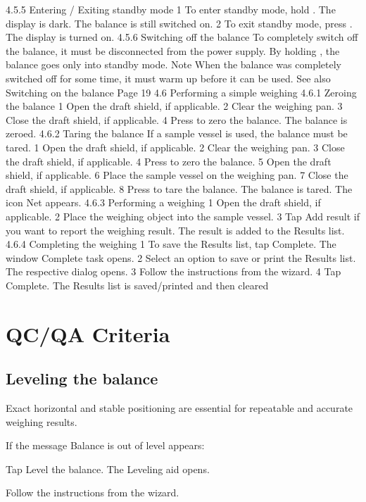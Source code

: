 \documentclass[12pt]{../SOP4_alpha}\usepackage[]{graphicx}\usepackage[]{xcolor}
\begin{document}
4.5.5 Entering / Exiting standby mode
1 To enter standby mode, hold .
The display is dark. The balance is still switched on.
2 To exit standby mode, press .
The display is turned on.
4.5.6 Switching off the balance
To completely switch off the balance, it must be disconnected from the power supply. By holding , the
balance goes only into standby mode.
Note
When the balance was completely switched off for some time, it must warm up before it can be used.
See also
Switching on the balance   Page 19
4.6 Performing a simple weighing
4.6.1 Zeroing the balance
1 Open the draft shield, if applicable.
2 Clear the weighing pan.
3 Close the draft shield, if applicable.
4 Press to zero the balance.
The balance is zeroed.
4.6.2 Taring the balance
If a sample vessel is used, the balance must be tared.
1 Open the draft shield, if applicable.
2 Clear the weighing pan.
3 Close the draft shield, if applicable.
4 Press to zero the balance.
5 Open the draft shield, if applicable.
6 Place the sample vessel on the weighing pan.
7 Close the draft shield, if applicable.
8 Press to tare the balance.
The balance is tared. The icon
Net
 appears.
4.6.3 Performing a weighing
1 Open the draft shield, if applicable.
2 Place the weighing object into the sample vessel.
3 Tap Add result if you want to report the weighing result.
The result is added to the Results list.
4.6.4 Completing the weighing
1 To save the Results list, tap Complete.
The window Complete task opens.
2 Select an option to save or print the Results list.
The respective dialog opens.
3 Follow the instructions from the wizard.
4 Tap Complete.
The Results list is saved/printed and then cleared



\section{QC/QA Criteria}

\subsection{Leveling the balance}

\NP Exact horizontal and stable positioning are essential for repeatable and accurate weighing results.

If the message Balance is out of level appears:

\NP Tap Level the balance. The Leveling aid opens.
 
\NP Follow the instructions from the wizard.
\end{document}
